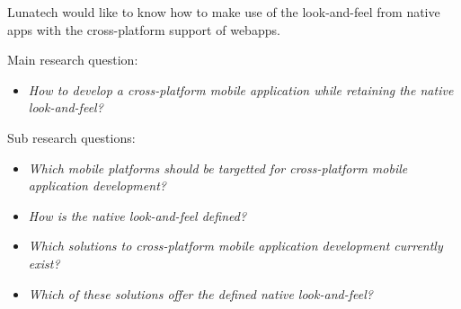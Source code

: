 Lunatech would like to know how to make use of the look-and-feel from native apps with the cross-platform support of webapps.


Main research question:
\begin{itemize}
\item \emph{How to develop a cross-platform mobile application while retaining the native look-and-feel?}
\end{itemize}

\noindent Sub research questions:
\begin{itemize}
\item \emph{Which mobile platforms should be targetted for cross-platform mobile application development?}
\item \emph{How is the native look-and-feel defined?}
\item \emph{Which solutions to cross-platform mobile application development currently exist?}
\item \emph{Which of these solutions offer the defined native look-and-feel?}
\end{itemize}